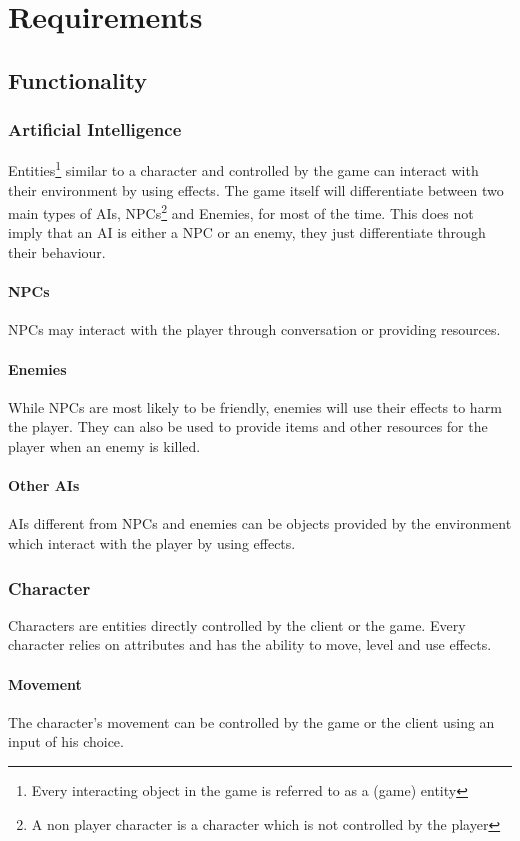 \documentclass[11pt]{article}
\begin{document}
\section{Requirements}
\subsection{Functionality}
\subsubsection{Artificial Intelligence}\label{subsec:fs10ai}
Entities\footnote{Every interacting object in the game is referred to as a (game) entity} similar to a character and controlled by the game can interact with their environment by using effects.
The game itself will differentiate between two main types of AIs, NPCs\footnote{A non player character is a character which is not controlled by the player} and Enemies, for most of the time. 
This does not imply that an AI is either a NPC or an enemy, they just differentiate through their behaviour.
\paragraph{NPCs}
NPCs may interact with the player through conversation or providing resources.
\paragraph{Enemies}
While NPCs are most likely to be friendly, enemies will use their effects to harm the player.
They can also be used to provide items and other resources for the player when an enemy is killed.
\paragraph{Other AIs}
AIs different from NPCs and enemies can be objects provided by the environment which interact with the player by using effects.
\subsubsection{Character}
Characters are entities directly controlled by the client or the game. 
Every character relies on attributes and has the ability to move, level and use effects.
\paragraph{Movement}
The character's movement can be controlled by the game or the client using an input of his choice.
\end{document}
